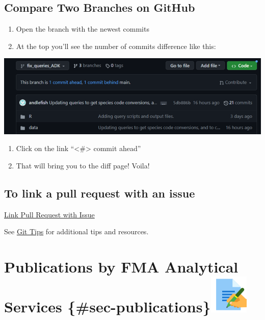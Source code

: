 \documentclass[
  letterpaper,
  DIV=11,
  numbers=noendperiod]{scrreprt}
\providecommand{\tightlist}{%
  \setlength{\itemsep}{0pt}\setlength{\parskip}{0pt}}\usepackage{longtable,booktabs,array}
\begin{document}
\section{Compare Two Branches on
GitHub}\label{compare-two-branches-on-github}

\begin{enumerate}
\def\labelenumi{\arabic{enumi}.}
\tightlist
\item
  Open the branch with the newest commits
\item
  At the top you'll see the number of commits difference like this:
\end{enumerate}

\includegraphics{_img/github_compare_2_branches.png}

\begin{enumerate}
\def\labelenumi{\arabic{enumi}.}
\setcounter{enumi}{2}
\tightlist
\item
  Click on the link ``\textless\#\textgreater{} commit ahead''
\item
  That will bring you to the diff page! Voila!
\end{enumerate}

\section{To link a pull request with an
issue}\label{to-link-a-pull-request-with-an-issue}

\href{https://docs.github.com/en/issues/tracking-your-work-with-issues/linking-a-pull-request-to-an-issue}{Link
Pull Request with Issue}

See \href{more-git.qmd}{Git Tips} for additional tips and resources.


\chapter[Publications by FMA Analytical Services
\{\#sec-publications\}]{\texorpdfstring{Publications by FMA Analytical
Services
\{\#sec-publications\}\protect\includegraphics[width=\textwidth,height=0.72917in]{_img/journalarticleicon.png}}{Publications by FMA Analytical Services \{\#sec-publications\}}}\label{publications-by-fma-analytical-services-sec-publications}
\end{document}

